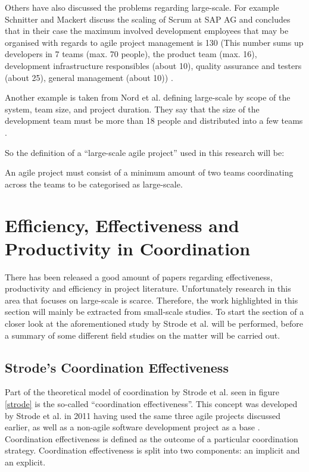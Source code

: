 Others have also discussed the problems regarding large-scale. For example Schnitter and Mackert discuss the scaling of Scrum at SAP AG and concludes that in their case the maximum involved development employees that may be organised with regards to agile project management is 130 (This number sums up developers in 7 teams (max. 70 people), the product team (max. 16), development infrastructure responsibles (about 10), quality assurance and testers (about 25), general management (about 10)) \cite{Nord2011}.

Another example is taken from Nord et al. defining large-scale by scope of the system, team size, and project duration. They say that the size of the development team must be more than 18 people and distributed into a few teams \cite{Robert2014}.

So the definition of a ``large-scale agile project'' used in this research will be:

\begin{fancyquotes}
An agile project must consist of a minimum amount of two teams coordinating across the teams to be categorised as large-scale.
\end{fancyquotes}

\section{Efficiency, Effectiveness and Productivity in Coordination}
\label{efficiency}

There has been released a good amount of papers regarding effectiveness, productivity and efficiency in project literature. Unfortunately research in this area that focuses on large-scale is scarce. Therefore, the work highlighted in this section will mainly be extracted from small-scale studies. To start the section of a closer look at the aforementioned study by Strode et al. will be performed, before a summary of some different field studies on the matter will be carried out.

\subsection{Strode's Coordination Effectiveness}

Part of the theoretical model of coordination by Strode et al. seen in figure \ref{strode} is the so-called ``coordination effectiveness''. This concept was developed by Strode et al. in 2011 having used the same three agile projects discussed earlier, as well as a non-agile software development project as a base \cite{Strode2011}. Coordination effectiveness is defined as the outcome of a particular coordination strategy. Coordination effectiveness is split into two components: an implicit and an explicit.

